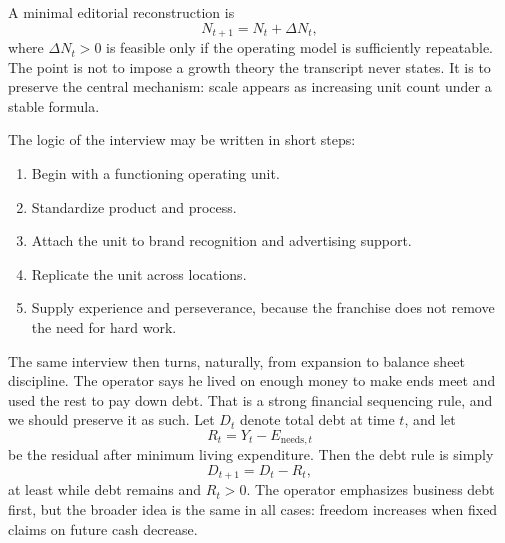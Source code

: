 A minimal editorial reconstruction is
\begin{equation}
N_{t+1} = N_t + \Delta N_t,
\end{equation}
where \(\Delta N_t > 0\) is feasible only if the operating model is sufficiently repeatable. The point is not to impose a growth theory the transcript never states. It is to preserve the central mechanism: scale appears as increasing unit count under a stable formula.

The logic of the interview may be written in short steps:
\begin{enumerate}
\item Begin with a functioning operating unit.
\item Standardize product and process.
\item Attach the unit to brand recognition and advertising support.
\item Replicate the unit across locations.
\item Supply experience and perseverance, because the franchise does not remove the need for hard work.
\end{enumerate}

The same interview then turns, naturally, from expansion to balance sheet discipline. The operator says he lived on enough money to make ends meet and used the rest to pay down debt. That is a strong financial sequencing rule, and we should preserve it as such. Let \(D_t\) denote total debt at time \(t\), and let
\begin{equation}
R_t = Y_t - E_{\text{needs},t}
\end{equation}
be the residual after minimum living expenditure. Then the debt rule is simply
\begin{equation}
D_{t+1} = D_t - R_t,
\end{equation}
at least while debt remains and \(R_t>0\). The operator emphasizes business debt first, but the broader idea is the same in all cases: freedom increases when fixed claims on future cash decrease.

\begin{figure}
\centering
{}
\end{figure}

